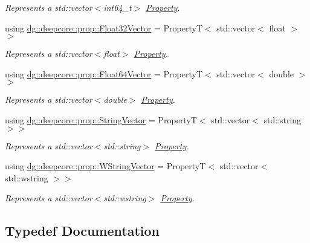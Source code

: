 \begin{DoxyCompactItemize}
\begin{DoxyCompactList}\small\item\em Represents a {\ttfamily std\+::vector$<$int64\+\_\+t$>$} \hyperlink{classdg_1_1deepcore_1_1_property}{Property}. \end{DoxyCompactList}\item 
using \hyperlink{group___process_properties_gab55f125818d29c40da45bf6bb17c769e}{dg\+::deepcore\+::prop\+::\+Float32\+Vector} = PropertyT$<$ std\+::vector$<$ float $>$$>$
\begin{DoxyCompactList}\small\item\em Represents a {\ttfamily std\+::vector$<$float$>$} \hyperlink{classdg_1_1deepcore_1_1_property}{Property}. \end{DoxyCompactList}\item 
using \hyperlink{group___process_properties_gae54c4277af43197673595ecb00b940d6}{dg\+::deepcore\+::prop\+::\+Float64\+Vector} = PropertyT$<$ std\+::vector$<$ double $>$$>$
\begin{DoxyCompactList}\small\item\em Represents a {\ttfamily std\+::vector$<$double$>$} \hyperlink{classdg_1_1deepcore_1_1_property}{Property}. \end{DoxyCompactList}\item 
using \hyperlink{group___process_properties_gaef939d9856c12ebae8e18db4b112325c}{dg\+::deepcore\+::prop\+::\+String\+Vector} = PropertyT$<$ std\+::vector$<$ std\+::string $>$$>$
\begin{DoxyCompactList}\small\item\em Represents a {\ttfamily std\+::vector$<$std\+::string$>$} \hyperlink{classdg_1_1deepcore_1_1_property}{Property}. \end{DoxyCompactList}\item 
using \hyperlink{group___process_properties_gaace0f946c7fa66d4294f15b240a3bb1a}{dg\+::deepcore\+::prop\+::\+W\+String\+Vector} = PropertyT$<$ std\+::vector$<$ std\+::wstring $>$$>$
\begin{DoxyCompactList}\small\item\em Represents a {\ttfamily std\+::vector$<$std\+::wstring$>$} \hyperlink{classdg_1_1deepcore_1_1_property}{Property}. \end{DoxyCompactList}\end{DoxyCompactItemize}


\subsection{Typedef Documentation}
